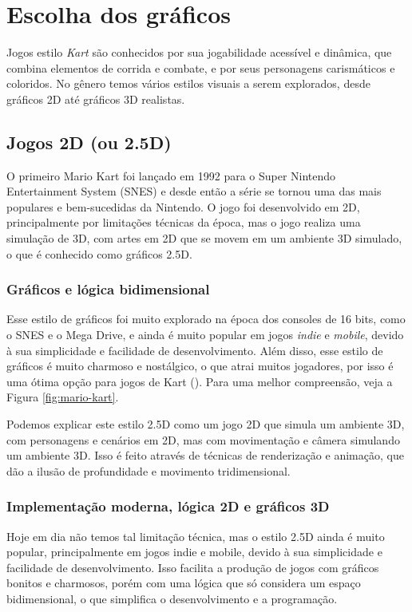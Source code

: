 \chapter{Escolha dos gráficos}

Jogos estilo \textit{Kart} são conhecidos por sua jogabilidade acessível e dinâmica, que combina elementos de corrida e combate, e por seus personagens carismáticos e coloridos. No gênero temos vários estilos visuais a serem explorados, desde gráficos 2D até gráficos 3D realistas.

\section{Jogos 2D (ou 2.5D)}

O primeiro Mario Kart foi lançado em 1992 para o Super Nintendo Entertainment System (SNES) e desde então a série se tornou uma das mais populares e bem-sucedidas da Nintendo. O jogo foi desenvolvido em 2D, principalmente por limitações técnicas da época, mas o jogo realiza uma simulação de 3D, com artes em 2D que se movem em um ambiente 3D simulado, o que é conhecido como gráficos 2.5D.

\subsection{Gráficos e lógica bidimensional}

Esse estilo de gráficos foi muito explorado na época dos consoles de 16 bits, como o SNES e o Mega Drive, e ainda é muito popular em jogos \textit{indie} e \textit{mobile}, devido à sua simplicidade e facilidade de desenvolvimento. Além disso, esse estilo de gráficos é muito charmoso e nostálgico, o que atrai muitos jogadores, por isso é uma ótima opção para jogos de Kart (\cite{graficos2.5D}). Para uma melhor compreensão, veja a Figura \ref{fig:mario-kart}.

Podemos explicar este estilo 2.5D como um jogo 2D que simula um ambiente 3D, com personagens e cenários em 2D, mas com movimentação e câmera simulando um ambiente 3D. Isso é feito através de técnicas de renderização e animação, que dão a ilusão de profundidade e movimento tridimensional.

\subsection{Implementação moderna, lógica 2D e gráficos 3D}

Hoje em dia não temos tal limitação técnica, mas o estilo 2.5D ainda é muito popular, principalmente em jogos indie e mobile, devido à sua simplicidade e facilidade de desenvolvimento. Isso facilita a produção de jogos com gráficos bonitos e charmosos, porém com uma lógica que só considera um espaço bidimensional, o que simplifica o desenvolvimento e a programação.

